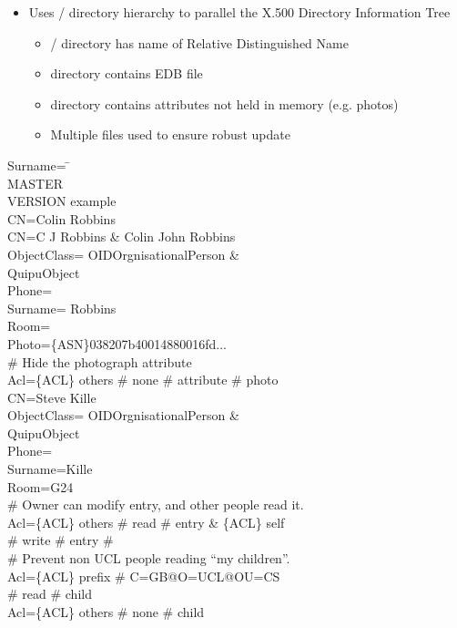 \begin {bwslide}
\begin {itemize}
\item Uses \unix/ directory hierarchy to parallel the X.500 
Directory Information Tree
\begin {itemize}
\item \unix/ directory has name of Relative Distinguished Name
\item directory contains EDB file
\item directory contains attributes not held in memory (e.g. photos)
\item Multiple files used to ensure robust update
\end {itemize}


\end {itemize}
\end {bwslide}



\begin {bwslide}
\begin{tabbing}
Surname= \= \kill \\
MASTER\\
VERSION example \\
CN=\>Colin Robbins \\
CN=\>C J Robbins \& Colin John Robbins \\
ObjectClass= {OID}OrgnisationalPerson \& \\
QuipuObject \\
Phone= \\
Surname=\> Robbins \\
Room= \\
Photo=\>\{ASN\}038207b40014880016fd... \\
\# Hide the photograph attribute \\
Acl=\>\{ACL\} others \# none \# attribute \# photo \\[2ex]
CN=\>Steve Kille \\
ObjectClass= {OID}OrgnisationalPerson \& \\
QuipuObject \\
Phone= \\
Surname=\>Kille \\
Room=\>G24 \\
\# Owner can modify entry, and other people read it. \\
Acl=\>\{ACL\} others \# read \# entry \& \{ACL\} self \\
\>\# write \# entry \# \\
\# Prevent non UCL people reading ``my children''. \\
Acl=\>\{ACL\} prefix \# C=GB@O=UCL@OU=CS  \\
\>\# read \# child \\
Acl=\>\{ACL\} others \# none \# child \\
\end{tabbing}

\end {bwslide}

